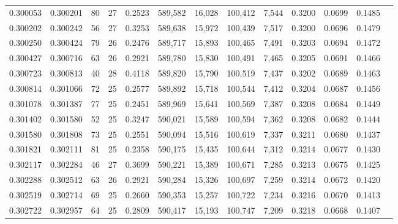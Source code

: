\begin{tabular}{rrrrrrrrrrrrr}
0.300053 & 0.300201 &  80 &  27 &                                     0.2523 & 589,582 &  16,028 & 100,412 &   7,544 & 0.3200 & 0.0699 & 0.1485 \\
0.300202 & 0.300242 &  56 &  27 &                                     0.3253 & 589,638 &  15,972 & 100,439 &   7,517 & 0.3200 & 0.0696 & 0.1479 \\
0.300250 & 0.300424 &  79 &  26 &                                     0.2476 & 589,717 &  15,893 & 100,465 &   7,491 & 0.3203 & 0.0694 & 0.1472 \\
0.300427 & 0.300716 &  63 &  26 &                                     0.2921 & 589,780 &  15,830 & 100,491 &   7,465 & 0.3205 & 0.0691 & 0.1466 \\
0.300723 & 0.300813 &  40 &  28 &                                     0.4118 & 589,820 &  15,790 & 100,519 &   7,437 & 0.3202 & 0.0689 & 0.1463 \\
0.300814 & 0.301066 &  72 &  25 &                                     0.2577 & 589,892 &  15,718 & 100,544 &   7,412 & 0.3204 & 0.0687 & 0.1456 \\
0.301078 & 0.301387 &  77 &  25 &                                     0.2451 & 589,969 &  15,641 & 100,569 &   7,387 & 0.3208 & 0.0684 & 0.1449 \\
0.301402 & 0.301580 &  52 &  25 &                                     0.3247 & 590,021 &  15,589 & 100,594 &   7,362 & 0.3208 & 0.0682 & 0.1444 \\
0.301580 & 0.301808 &  73 &  25 &                                     0.2551 & 590,094 &  15,516 & 100,619 &   7,337 & 0.3211 & 0.0680 & 0.1437 \\
0.301821 & 0.302111 &  81 &  25 &                                     0.2358 & 590,175 &  15,435 & 100,644 &   7,312 & 0.3214 & 0.0677 & 0.1430 \\
0.302117 & 0.302284 &  46 &  27 &                                     0.3699 & 590,221 &  15,389 & 100,671 &   7,285 & 0.3213 & 0.0675 & 0.1425 \\
0.302288 & 0.302512 &  63 &  26 &                                     0.2921 & 590,284 &  15,326 & 100,697 &   7,259 & 0.3214 & 0.0672 & 0.1420 \\
0.302519 & 0.302714 &  69 &  25 &                                     0.2660 & 590,353 &  15,257 & 100,722 &   7,234 & 0.3216 & 0.0670 & 0.1413 \\
0.302722 & 0.302957 &  64 &  25 &                                     0.2809 & 590,417 &  15,193 & 100,747 &   7,209 & 0.3218 & 0.0668 & 0.1407 \\

\end{tabular}
